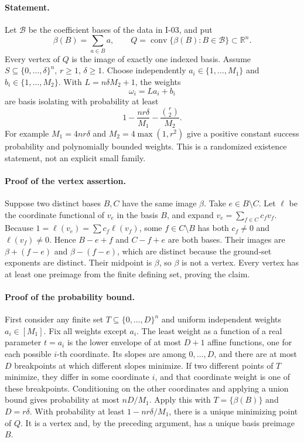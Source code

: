\documentclass[11pt,a4paper]{article}
\theoremstyle{definition}\newtheorem{definition}{Definition}
\begin{document}
\paragraph{Statement.}
Let $\mathcal B$ be the coefficient bases of the data in I-03, and put
\[
 \beta(B)=\sum_{a\in B}a,\qquad
 Q=\operatorname{conv}\{\beta(B):B\in\mathcal B\}\subset\mathbb R^n.
\]
Every vertex of $Q$ is the image of exactly one indexed basis.
Assume $S\subseteq\{0,\ldots,\delta\}^{n}$, $r\ge1$, $\delta\ge1$.
Choose independently
$a_i\in\{1,\ldots,M_1\}$ and $b_i\in\{1,\ldots,M_2\}$.
With $L=n\delta M_2+1$, the weights
\[
 \omega_i=L a_i+b_i
\tag{I.4}
\]
are basis isolating with probability at least
\[
 1-\frac{nr\delta}{M_1}-\frac{\binom r2}{M_2}.
\tag{I.5}
\]
For example $M_1=4nr\delta$ and $M_2=4\max(1,r^2)$ give a positive
constant success probability and polynomially bounded weights.  This
is a randomized existence statement, not an explicit small family.

\paragraph{Proof of the vertex assertion.}
Suppose two distinct bases $B,C$ have the same image $\beta$.
Take $e\in B\setminus C$.  Let $\ell$ be the coordinate functional
of $v_e$ in the basis $B$, and expand $v_e=\sum_{f\in C}c_fv_f$.
Because $1=\ell(v_e)=\sum c_f\ell(v_f)$, some
$f\in C\setminus B$ has both $c_f\ne0$ and $\ell(v_f)\ne0$.
Hence $B-e+f$ and $C-f+e$ are both bases.  Their images are
$\beta+(f-e)$ and $\beta-(f-e)$, which are distinct because the
ground-set exponents are distinct.  Their midpoint is $\beta$,
so $\beta$ is not a vertex.  Every vertex has at least one preimage
from the finite defining set, proving the claim.

\paragraph{Proof of the probability bound.}
First consider any finite set $T\subseteq\{0,\ldots,D\}^{n}$ and
uniform independent weights $a_i\in[M_1]$.  Fix all weights except
$a_i$.  The least weight as a function of a real parameter $t=a_i$
is the lower envelope of at most $D+1$ affine functions, one for
each possible $i$-th coordinate.  Its slopes are among
$0,\ldots,D$, and there are at most $D$ breakpoints at which
different slopes minimize.  If two different points of $T$ minimize,
they differ in some coordinate $i$, and that coordinate weight is
one of these breakpoints.  Conditioning on the other coordinates
and applying a union bound gives probability at most $nD/M_1$.
Apply this with $T=\{\beta(B)\}$ and $D=r\delta$.
With probability at least $1-nr\delta/M_1$, there is a unique
minimizing point of $Q$.  It is a vertex and, by the preceding
argument, has a unique basis preimage $B$.
\end{document}
